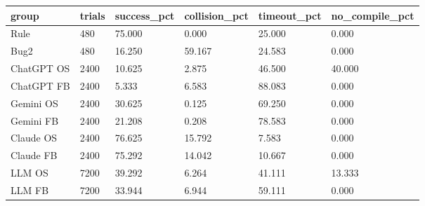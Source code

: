 \begin{tabular}{llllll}
\hline
group & trials & success\_pct & collision\_pct & timeout\_pct & no\_compile\_pct \\
\hline
Rule & 480 & 75.000 & 0.000 & 25.000 & 0.000 \\
Bug2 & 480 & 16.250 & 59.167 & 24.583 & 0.000 \\
ChatGPT OS & 2400 & 10.625 & 2.875 & 46.500 & 40.000 \\
ChatGPT FB & 2400 & 5.333 & 6.583 & 88.083 & 0.000 \\
Gemini OS & 2400 & 30.625 & 0.125 & 69.250 & 0.000 \\
Gemini FB & 2400 & 21.208 & 0.208 & 78.583 & 0.000 \\
Claude OS & 2400 & 76.625 & 15.792 & 7.583 & 0.000 \\
Claude FB & 2400 & 75.292 & 14.042 & 10.667 & 0.000 \\
LLM OS & 7200 & 39.292 & 6.264 & 41.111 & 13.333 \\
LLM FB & 7200 & 33.944 & 6.944 & 59.111 & 0.000 \\
\hline
\end{tabular}
